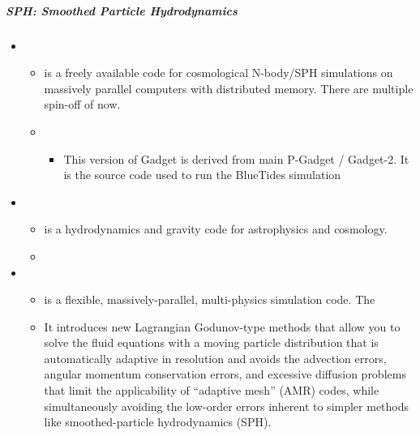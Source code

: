 \documentclass[letterpaper,10pt,english]{sphinxmanual}
\begin{document}
\subparagraph{SPH: Smoothed Particle Hydrodynamics}
\label{\detokenize{resource/astro/topics/simulations:sph-smoothed-particle-hydrodynamics}}\begin{itemize}
\item {} 
\begin{itemize}
\item {} 
 is a freely available code for cosmological
N-body/SPH simulations on massively parallel computers with
distributed memory. There are multiple spin-off of  now.

\item {} 
\begin{itemize}
\item {} 
This version of Gadget is derived from main P-Gadget /
Gadget-2. It is the source code used to run the BlueTides
simulation

\end{itemize}

\end{itemize}

\item {} 
\begin{itemize}
\item {} 
 is a hydrodynamics and gravity code for astrophysics and
cosmology.

\item {} 

\end{itemize}

\item {} 
\begin{itemize}
\item {} 
 is a flexible, massively-parallel, multi-physics
simulation code. The 

\item {} 
It introduces new Lagrangian Godunov-type methods that allow you
to solve the fluid equations with a moving particle distribution
that is automatically adaptive in resolution and avoids the
advection errors, angular momentum conservation errors, and
excessive diffusion problems that limit the applicability of
“adaptive mesh” (AMR) codes, while simultaneously avoiding the
low-order errors inherent to simpler methods like
smoothed-particle hydrodynamics (SPH).


\end{itemize}
\end{itemize}
\end{document}
